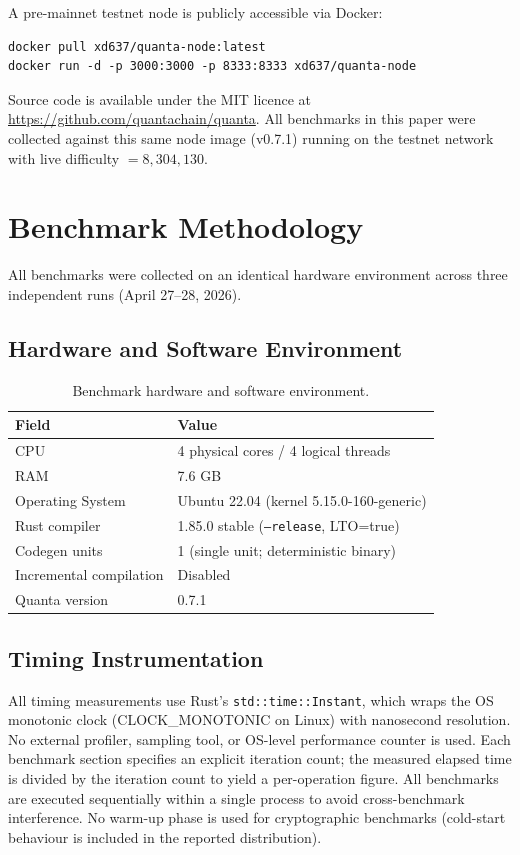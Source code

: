 \documentclass[11pt,a4paper]{article}
\begin{document}
A pre-mainnet testnet node is publicly accessible via Docker:
\begin{lstlisting}
docker pull xd637/quanta-node:latest
docker run -d -p 3000:3000 -p 8333:8333 xd637/quanta-node
\end{lstlisting}
Source code is available under the MIT licence at
\url{https://github.com/quantachain/quanta}.
All benchmarks in this paper were collected against this same node image
(v0.7.1) running on the testnet network with live difficulty $= 8{,}304{,}130$.

\section{Benchmark Methodology}
\label{sec:methodology}
All benchmarks were collected on an identical hardware environment across
three independent runs (April 27--28, 2026).

\subsection{Hardware and Software Environment}

\begin{table}[h]
\centering
\small
\begin{tabular}{@{}ll@{}}
\toprule
\textbf{Field} & \textbf{Value} \\
\midrule
CPU & 4 physical cores / 4 logical threads \\
RAM & 7.6 GB \\
Operating System & Ubuntu 22.04 (kernel 5.15.0-160-generic) \\
Rust compiler & 1.85.0 stable (\texttt{--release}, LTO=true) \\
Codegen units & 1 (single unit; deterministic binary) \\
Incremental compilation & Disabled \\
Quanta version & 0.7.1 \\
\bottomrule
\end{tabular}
\caption{Benchmark hardware and software environment.}
\label{tab:env}
\end{table}

\subsection{Timing Instrumentation}

All timing measurements use Rust's \texttt{std::time::Instant}, which wraps
the OS monotonic clock (CLOCK\_MONOTONIC on Linux) with nanosecond resolution.
No external profiler, sampling tool, or OS-level performance counter is used.
Each benchmark section specifies an explicit iteration count; the measured
elapsed time is divided by the iteration count to yield a per-operation figure.
All benchmarks are executed sequentially within a single process to avoid
cross-benchmark interference. No warm-up phase is used for cryptographic
benchmarks (cold-start behaviour is included in the reported distribution).
\end{document}
